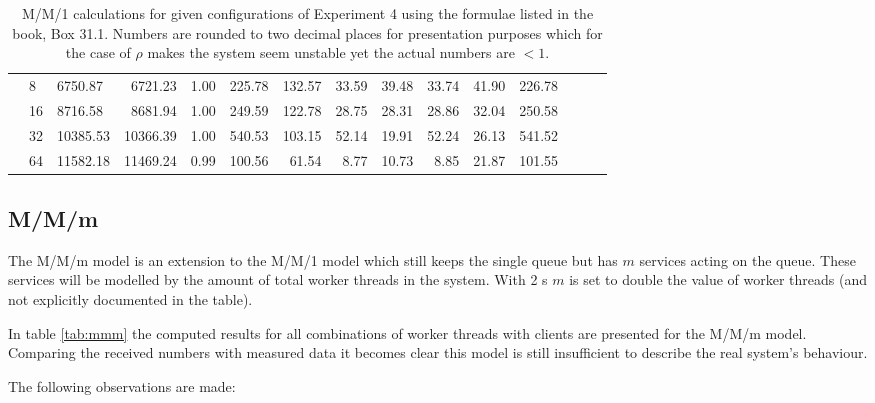 \begin{table}
{\begin{tabular}{lllrrrrrrrrrrrr}
                    \addlinespace
                    288      & 8  & 6750.87  & 6721.23   & 1.00   & 225.78 & 132.57 & 33.59 & 39.48 & 33.74 & 41.90 & 226.78          \\
                             & 16 & 8716.58  & 8681.94   & 1.00   & 249.59 & 122.78 & 28.75 & 28.31 & 28.86 & 32.04 & 250.58          \\
                             & 32 & 10385.53 & 10366.39  & 1.00   & 540.53 & 103.15 & 52.14 & 19.91 & 52.24 & 26.13 & 541.52          \\
                             & 64 & 11582.18 & 11469.24  & 0.99   & 100.56 & 61.54  & 8.77  & 10.73 & 8.85  & 21.87 & 101.55          \\
                    \bottomrule
                \end{tabular}
                \caption{M/M/1 calculations for given configurations of Experiment 4 using the formulae listed in
                         the book, Box 31.1. Numbers are rounded to two decimal places for presentation
                         purposes which for the case of $\rho$ makes the system seem unstable yet the actual numbers are
                         $< 1$.\label{tab:mm1}}
            }
        \end{table}

    \subsection{M/M/m\label{subsec:7_mmm}}
        The M/M/m model is an extension to the M/M/1 model which still keeps the single queue but has $m$ services
        acting on the queue. These services will be modelled by the amount of total worker threads in the system. With 2
        \mw{}s $m$ is set to double the value of worker threads (and not explicitly documented in the table).

        In table \ref{tab:mmm} the computed results for all combinations of worker threads with clients are presented
        for the M/M/m model. Comparing the received numbers with measured data it becomes clear this model is still
        insufficient to describe the real system's behaviour.

        The following observations are made:

